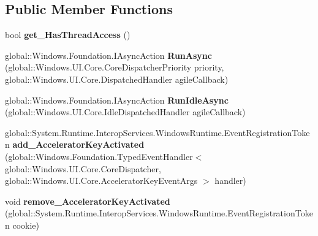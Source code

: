 \subsection*{Public Member Functions}
\begin{DoxyCompactItemize}
\item 
\mbox{\label{class_windows_1_1_u_i_1_1_core_1_1_core_dispatcher_aae3a5de5404c93a4fced870962f00905}} 
bool {\bfseries get\+\_\+\+Has\+Thread\+Access} ()
\item 
\mbox{\label{class_windows_1_1_u_i_1_1_core_1_1_core_dispatcher_ab32476eaa8140ce65276d22b3ca91205}} 
global\+::\+Windows.\+Foundation.\+I\+Async\+Action {\bfseries Run\+Async} (global\+::\+Windows.\+U\+I.\+Core.\+Core\+Dispatcher\+Priority priority, global\+::\+Windows.\+U\+I.\+Core.\+Dispatched\+Handler agile\+Callback)
\item 
\mbox{\label{class_windows_1_1_u_i_1_1_core_1_1_core_dispatcher_ae1d81c29e61aa9d3e601781f291624c6}} 
global\+::\+Windows.\+Foundation.\+I\+Async\+Action {\bfseries Run\+Idle\+Async} (global\+::\+Windows.\+U\+I.\+Core.\+Idle\+Dispatched\+Handler agile\+Callback)
\item 
\mbox{\label{class_windows_1_1_u_i_1_1_core_1_1_core_dispatcher_ae59e989cb2be9847e256c8717dcf0763}} 
global\+::\+System.\+Runtime.\+Interop\+Services.\+Windows\+Runtime.\+Event\+Registration\+Token {\bfseries add\+\_\+\+Accelerator\+Key\+Activated} (global\+::\+Windows.\+Foundation.\+Typed\+Event\+Handler$<$ global\+::\+Windows.\+U\+I.\+Core.\+Core\+Dispatcher, global\+::\+Windows.\+U\+I.\+Core.\+Accelerator\+Key\+Event\+Args $>$ handler)
\item 
\mbox{\label{class_windows_1_1_u_i_1_1_core_1_1_core_dispatcher_a96732786d7ff5dad968e1ed05e297c99}} 
void {\bfseries remove\+\_\+\+Accelerator\+Key\+Activated} (global\+::\+System.\+Runtime.\+Interop\+Services.\+Windows\+Runtime.\+Event\+Registration\+Token cookie)
\item 
\mbox{\label{class_windows_1_1_u_i_1_1_core_1_1_core_dispatcher_a88a12a752cb9f80bb154d5d4f57d0d75}} 

\end{DoxyCompactItemize}
